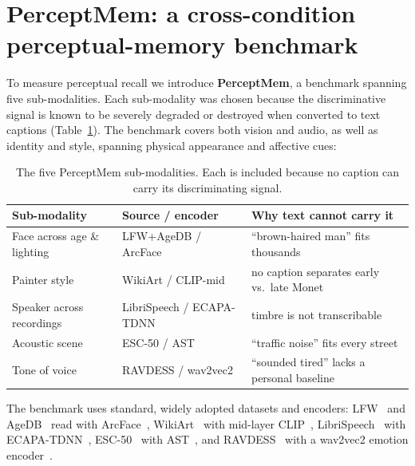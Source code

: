 \section{PerceptMem: a cross-condition perceptual-memory benchmark}
\label{sec:bench}

To measure perceptual recall we introduce \textbf{PerceptMem}, a benchmark spanning five sub-modalities. Each sub-modality was chosen because the discriminative signal is known to be severely degraded or destroyed when converted to text captions (Table~\ref{tab:datasets}). The benchmark covers both vision and audio, as well as identity and style, spanning physical appearance and affective cues:

\begin{table}[h]
\small\centering
\caption{The five PerceptMem sub-modalities. Each is included because no caption can carry its discriminating signal.}
\label{tab:datasets}
\begin{tabularx}{\linewidth}{@{}llX@{}}
\toprule
\textbf{Sub-modality} & \textbf{Source / encoder} & \textbf{Why text cannot carry it} \\
\midrule
Face across age \& lighting & LFW+AgeDB / ArcFace & ``brown-haired man'' fits thousands \\
Painter style & WikiArt / CLIP-mid & no caption separates early vs.\ late Monet \\
Speaker across recordings & LibriSpeech / ECAPA-TDNN & timbre is not transcribable \\
Acoustic scene & ESC-50 / AST & ``traffic noise'' fits every street \\
Tone of voice & RAVDESS / wav2vec2 & ``sounded tired'' lacks a personal baseline \\
\bottomrule
\end{tabularx}
\end{table}

The benchmark uses standard, widely adopted datasets and encoders: LFW~\citep{lfw} and AgeDB~\citep{agedb} read with ArcFace~\citep{arcface}, WikiArt~\citep{wikiart} with mid-layer CLIP~\citep{clip}, LibriSpeech~\citep{librispeech} with ECAPA-TDNN~\citep{ecapa}, ESC-50~\citep{esc50} with AST~\citep{ast}, and RAVDESS~\citep{ravdess} with a wav2vec2 emotion encoder~\citep{wav2vec2}.

